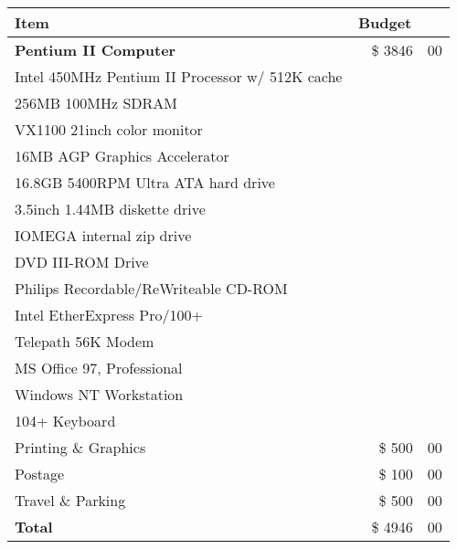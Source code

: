 \begin{table}[htb]
  \begin{center}
    \begin{tabular}{lcr@{.}l}
      Item & \multicolumn{2}{c}{Budget}\\ \hline
      \large {\bf Pentium II Computer} &  & \$ 3846 & 00 \\
      Intel 450MHz Pentium II Processor w/ 512K cache & &
      \multicolumn{2}{c}{} \\
      256MB 100MHz SDRAM & & \multicolumn{2}{c}{} \\
      VX1100 21inch color monitor& &\multicolumn{2}{c}{} \\
      16MB AGP Graphics Accelerator& &\multicolumn{2}{c}{} \\
      16.8GB 5400RPM Ultra ATA hard drive& &\multicolumn{2}{c}{} \\
      3.5inch 1.44MB diskette drive & &\multicolumn{2}{c}{} \\
      IOMEGA internal zip drive & &\multicolumn{2}{c}{} \\
      DVD III-ROM Drive& &\multicolumn{2}{c}{} \\
      Philips Recordable/ReWriteable CD-ROM& &\multicolumn{2}{c}{} \\
      Intel EtherExpress Pro/100+ & & \multicolumn{2}{c}{} \\
      Telepath 56K Modem & & \multicolumn{2}{c}{} \\
      MS Office 97, Professional & & \multicolumn{2}{c}{} \\
      Windows NT Workstation & &\multicolumn{2}{c}{} \\
      104+ Keyboard  & & \multicolumn{2}{c}{} \\

      Printing \& Graphics& & \$ 500 & 00 \\
      Postage & & \$ 100 & 00 \\
      Travel \& Parking & & \$ 500 & 00 \\
      \hline
      {\bf Total}&& \$ 4946 & 00 \\
    \end{tabular}
  \end{center}
\end{table}


